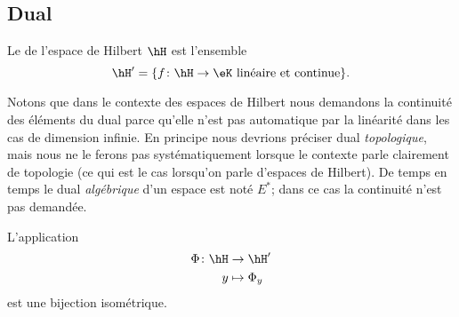 \subsection{Dual}

\begin{definition}
    Le  de l'espace de Hilbert \( \hH\) est l'ensemble
    \begin{equation}
        \hH'=\{ f\colon \hH\to \eK\text{ linéaire et continue} \}.
    \end{equation}
\end{definition}
Notons que dans le contexte des espaces de Hilbert nous demandons la continuité des éléments du dual parce qu'elle n'est pas automatique par la linéarité dans les cas de dimension infinie. En principe nous devrions préciser dual \emph{topologique}, mais nous ne le ferons pas systématiquement lorsque le contexte parle clairement de topologie (ce qui est le cas lorsqu'on parle d'espaces de Hilbert). De temps en temps le dual \emph{algébrique} d'un espace est noté \( E^*\); dans ce cas la continuité n'est pas demandée.

\begin{theorem}        \label{ThoQgTovL}
    L'application
    \begin{equation}
        \begin{aligned}
            \Phi\colon \hH&\to \hH' \\
            y&\mapsto \Phi_y 
        \end{aligned}
    \end{equation}
    est une bijection isométrique.
\end{theorem}

